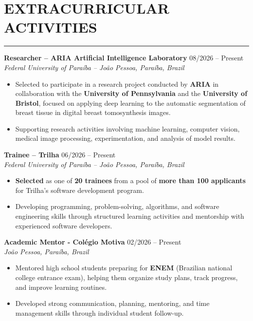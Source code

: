 \documentclass[10pt,a4paper]{article}
\begin{document}
\section*{EXTRACURRICULAR ACTIVITIES}
\vspace{-2.5mm}
\hrule
\vspace{1.2mm}

\textbf{Researcher -- ARIA Artificial Intelligence Laboratory}
\hfill 08/2026 -- Present \\
\textit{Federal University of Paraíba -- João Pessoa, Paraíba, Brazil}

\begin{itemize}[leftmargin=*,itemsep=-2pt,topsep=1pt]
    \item Selected to participate in a research project conducted by \textbf{ARIA} in collaboration with the \textbf{University of Pennsylvania} and the \textbf{University of Bristol}, focused on applying deep learning to the automatic segmentation of breast tissue in digital breast tomosynthesis images.

    \item Supporting research activities involving machine learning, computer vision, medical image processing, experimentation, and analysis of model results.
\end{itemize}

\noindent
\textbf{Trainee -- Trilha}
\hfill 06/2026 -- Present \\
\textit{Federal University of Paraíba -- João Pessoa, Paraíba, Brazil}

\begin{itemize}[leftmargin=*,itemsep=-2pt,topsep=1pt]
    \item \textbf{Selected} as one of \textbf{20 trainees} from a pool of \textbf{more than 100 applicants} for Trilha's software development program.

    \item Developing programming, problem-solving, algorithms, and software engineering skills through structured learning activities and mentorship with experienced software developers.
\end{itemize}

\vspace{1mm}
\noindent
\textbf{Academic Mentor - Colégio Motiva} \hfill 02/2026 -- Present \\
\textit{João Pessoa, Paraíba, Brazil}
\begin{itemize}[leftmargin=*,itemsep=-2pt, topsep=1pt]
    \item Mentored high school students preparing for \textbf{ENEM} (Brazilian national college entrance exam), helping them organize study plans, track progress, and improve learning routines.
    \item Developed strong communication, planning, mentoring, and time management skills through individual student follow-up.
\end{itemize}
\end{document}

